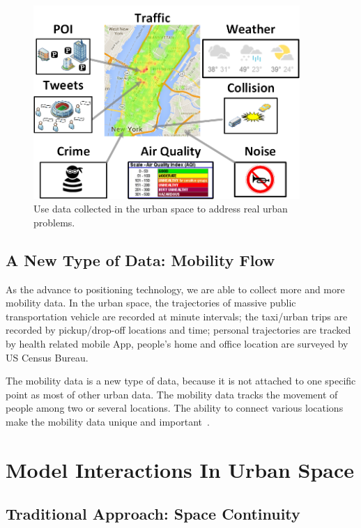 \begin{figure}[h]
\centering
\includegraphics[width=0.9\textwidth]{fig/intro-data.png}
\caption{Use data collected in the urban space to address real urban problems.}
\label{fig:demo-data}
\end{figure}



\subsection{A New Type of Data: Mobility Flow}


As the advance to positioning technology, we are able to collect more and more mobility data.
In the urban space, the trajectories of massive public transportation vehicle are recorded at minute intervals; the taxi/urban trips are recorded by pickup/drop-off locations and time; personal trajectories are tracked by health related mobile App, people's home and office location are surveyed by US Census Bureau.


The mobility data is a new type of data, because it is not attached to one specific point as most of other urban data.
The mobility data tracks the movement of people among two or several locations. The ability to connect various locations make the mobility data unique and important~\cite{ZCWY14}.




\section{Model Interactions In Urban Space}



\subsection{Traditional Approach: Space Continuity}


